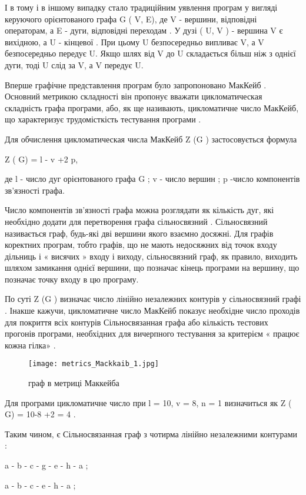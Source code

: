 І в тому і в іншому випадку стало традиційним уявлення програм у вигляді керуючого орієнтованого графа G ( V, E), де V - вершини, відповідні операторам, а E - дуги, відповідні переходам . У дузі ( U, V ) - вершина V є вихідною, а U - кінцевої . При цьому U безпосередньо випливає V, а V безпосередньо передує U. Якщо шлях від V до U складається більш ніж з однієї дуги, тоді U слід за V, а V передує U.

Вперше графічне представлення програм було запропоновано МакКейб . Основний метрикою складності він пропонує вважати цикломатическая складність графа програми, або, як ще називають, цикломатичне число МакКейб, що характеризує трудомісткість тестування програми .

Для обчислення цикломатическая числа МакКейб Z (G ) застосовується формула

Z ( G) = l - v +2 p,

де l - число дуг орієнтованого графа G ; v - число вершин ; p -число компонентів зв'язності графа.

Число компонентів зв'язності графа можна розглядати як кількість дуг, які необхідно додати для перетворення графа сільносвязний . Сільносвязний називається граф, будь-які дві вершини якого взаємно досяжні. Для графів коректних програм, тобто графів, що не мають недосяжних від точок входу дільниць і « висячих » входу і виходу, сільносвязний граф, як правило, виходить шляхом замикання однієї вершини, що позначає кінець програми на вершину, що позначає точку входу в цю програму.

По суті Z (G ) визначає число лінійно незалежних контурів у сільносвязний графі . Інакше кажучи, цикломатичне число МакКейб показує необхідне число проходів для покриття всіх контурів Сільносвязанная графа або кількість тестових прогонів програми, необхідних для вичерпного тестування за критерієм « працює кожна гілка» .

\begin{figure}
    \centering
    \texttt{[image: metrics\_Mackkaib\_1.jpg]}
    \caption{граф в метриці Маккейба}
    \label{fig:awesome_image}
\end{figure}

Для програми цикломатичне число при l = 10, v = 8, n = 1 визначиться як Z ( G) = 10-8 +2 = 4 .

Таким чином, є Сільносвязанная граф з чотирма лінійно незалежними контурами :

a - b - c - g - e - h - a ;

a - b - c - e - h - a ;

